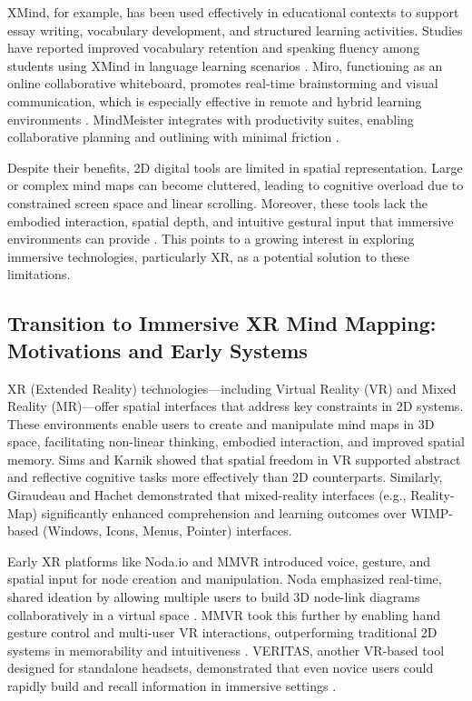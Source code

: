 \documentclass{CPP}
\begin{document}
XMind, for example, has been used effectively in educational contexts to support essay writing, vocabulary development, and structured learning activities. Studies have reported improved vocabulary retention and speaking fluency among students using XMind in language learning scenarios \citep{Salsabilla2024, Mammen2016}. Miro, functioning as an online collaborative whiteboard, promotes real-time brainstorming and visual communication, which is especially effective in remote and hybrid learning environments \citep{Khair2023}. MindMeister integrates with productivity suites, enabling collaborative planning and outlining with minimal friction \citep{Bhattacharya2020}.

Despite their benefits, 2D digital tools are limited in spatial representation. Large or complex mind maps can become cluttered, leading to cognitive overload due to constrained screen space and linear scrolling. Moreover, these tools lack the embodied interaction, spatial depth, and intuitive gestural input that immersive environments can provide \citep{Khair2023}. This points to a growing interest in exploring immersive technologies, particularly XR, as a potential solution to these limitations.

\subsection{Transition to Immersive XR Mind Mapping: Motivations and Early Systems}

XR (Extended Reality) technologies—including Virtual Reality (VR) and Mixed Reality (MR)—offer spatial interfaces that address key constraints in 2D systems. These environments enable users to create and manipulate mind maps in 3D space, facilitating non-linear thinking, embodied interaction, and improved spatial memory. Sims and Karnik \citep{Sims2021} showed that spatial freedom in VR supported abstract and reflective cognitive tasks more effectively than 2D counterparts. Similarly, Giraudeau and Hachet \citep{Giraudeau2017} demonstrated that mixed-reality interfaces (e.g., Reality-Map) significantly enhanced comprehension and learning outcomes over WIMP-based (Windows, Icons, Menus, Pointer) interfaces.

Early XR platforms like Noda.io and MMVR introduced voice, gesture, and spatial input for node creation and manipulation. Noda emphasized real-time, shared ideation by allowing multiple users to build 3D node-link diagrams collaboratively in a virtual space \citep{Kozachek2023}. MMVR took this further by enabling hand gesture control and multi-user VR interactions, outperforming traditional 2D systems in memorability and intuitiveness \citep{Miyasugi2017}. VERITAS, another VR-based tool designed for standalone headsets, demonstrated that even novice users could rapidly build and recall information in immersive settings \citep{Sims2021}.
\end{document}
